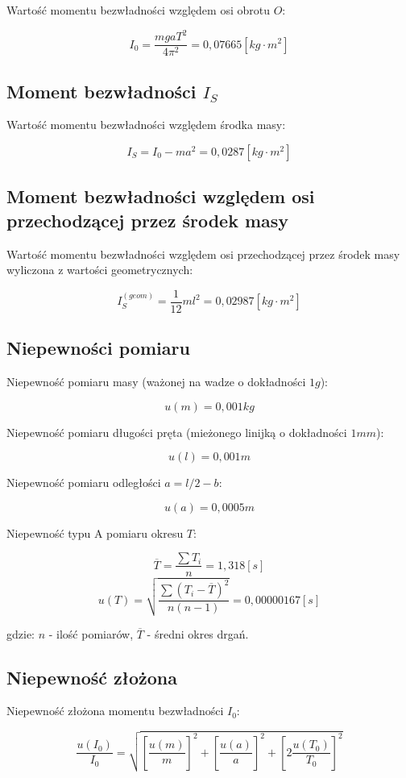 \documentclass[a4paper,10pt,twoside]{article}
\begin{document}
Wartość momentu bezwładności względem osi obrotu $O$:

$$ I_0 = \frac{mgaT^2}{4\pi^2} = 0,07665 \unit{[kg \cdot m^2]} $$

\subsection{Moment bezwładności $I_S$}
Wartość momentu bezwładności względem środka masy:

$$ I_S = I_0 - ma^2 = 0,0287 \unit{[kg \cdot m^2]} $$

\subsection{Moment bezwładności względem osi przechodzącej przez środek masy}

Wartość momentu bezwładności względem osi przechodzącej przez środek masy wyliczona z wartości geometrycznych:

$$ I_S^{(geom)} = \frac{1}{12}ml^2 = 0,02987 \unit{[kg \cdot m^2]}$$

\subsection{Niepewności pomiaru}

Niepewność pomiaru masy (ważonej na wadze o dokładności $1 \unit{g}$):

$$ u(m) = 0,001 \unit{kg} $$

Niepewność pomiaru długości pręta (mieżonego linijką o dokładności $1 \unit{mm}$):

$$ u(l) = 0,001 \unit{m} $$

Niepewność pomiaru odległości $a = l/2 - b$:

$$ u(a) = 0,0005 \unit{m} $$

Niepewność typu A pomiaru okresu $T$:

$$\overline{T}=\frac{\sum{T_i}}{n}=1,318 \unit{[s]}$$
$$u(T)=\sqrt{\frac{\sum{(T_i-\overline{T})^2}}{n(n-1)}} = 0,00000167\unit{[s]}$$

gdzie: $n$ - ilość pomiarów, $\overline{T}$ - średni okres drgań.

\subsection{Niepewność złożona}

Niepewność złożona momentu bezwładności $I_0$:

$$ \frac{u(I_0)}{I_0} = \sqrt{ \left[ \frac{u(m)}{m} \right]^2 + \left[ \frac{u(a)}{a} \right]^2 + \left[ 2 \frac{u(T_0)}{T_0} \right]^2} $$
\end{document}
